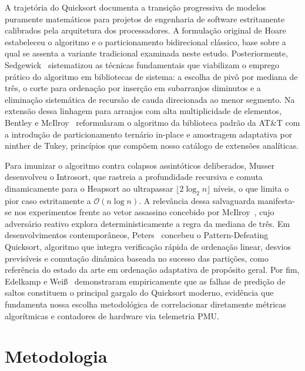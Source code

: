 \documentclass[12pt]{article}
\begin{document}
A trajetória do Quicksort documenta a transição progressiva de modelos puramente matemáticos para projetos de engenharia de software estritamente calibrados pela arquitetura dos processadores. A formulação original de Hoare~\cite{Hoare1961,Hoare1962} estabeleceu o algoritmo e o particionamento bidirecional clássico, base sobre a qual se assenta a variante tradicional examinada neste estudo. Posteriormente, Sedgewick~\cite{Sedgewick1978} sistematizou as técnicas fundamentais que viabilizam o emprego prático do algoritmo em bibliotecas de sistema: a escolha de pivô por mediana de três, o corte para ordenação por inserção em subarranjos diminutos e a eliminação sistemática de recursão de cauda direcionada ao menor segmento. Na extensão dessa linhagem para arranjos com alta multiplicidade de elementos, Bentley e McIlroy~\cite{BentleyMcIlroy1993} reformularam o algoritmo da biblioteca padrão da AT\&T com a introdução de particionamento ternário in-place e amostragem adaptativa por ninther de Tukey, princípios que compõem nosso catálogo de extensões analíticas.

Para imunizar o algoritmo contra colapsos assintóticos deliberados, Musser~\cite{Musser1997} desenvolveu o Introsort, que rastreia a profundidade recursiva e comuta dinamicamente para o Heapsort ao ultrapassar $\lfloor 2 \log_2 n \rfloor$ níveis, o que limita o pior caso estritamente a $\mathcal{O}(n \log n)$. A relevância dessa salvaguarda manifesta-se nos experimentos frente ao vetor assassino concebido por McIlroy~\cite{McIlroy1999}, cujo adversário reativo explora deterministicamente a regra da mediana de três. Em desenvolvimentos contemporâneos, Peters~\cite{Peters2021} concebeu o Pattern-Defeating Quicksort, algoritmo que integra verificação rápida de ordenação linear, desvios previsíveis e comutação dinâmica baseada no sucesso das partições, como referência do estado da arte em ordenação adaptativa de propósito geral. Por fim, Edelkamp e Weiß~\cite{EdelkampWeiss2016} demonstraram empiricamente que as falhas de predição de saltos constituem o principal gargalo do Quicksort moderno, evidência que fundamenta nossa escolha metodológica de correlacionar diretamente métricas algorítmicas e contadores de hardware via telemetria PMU.

\section{Metodologia}\label{sec:metodologia}
\end{document}
